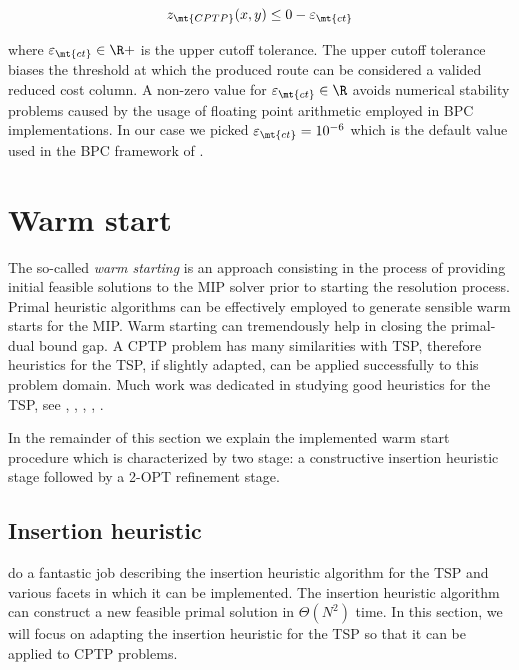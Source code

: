 \begin{equation}
	z_\mt{CPTP}(x, y) \le 0 - \varepsilon_{\mt{ct}}
\end{equation}

where $\varepsilon_{\mt{ct}} \in \R+$ is the upper cutoff tolerance.
The upper cutoff tolerance biases the threshold at which the produced
route can be considered a valided reduced cost column.
A non-zero value for $\varepsilon_{\mt{ct}} \in \R$ avoids numerical
stability problems caused by the usage of floating point arithmetic
employed in BPC implementations.
In our case we picked $\varepsilon_{\mt{ct}} = 10^{-6}$ which
is the default value used in the BPC framework of \textcite{sadykov2021}.

\section{Warm start}
\label{sec:impl-warm-start}

The so-called \textit{warm starting} is an approach consisting in the process
of providing initial feasible solutions to the MIP solver prior to starting
the resolution process.
Primal heuristic algorithms can be effectively employed to generate sensible warm starts for the MIP.
Warm starting can tremendously help in closing the primal-dual bound gap.
A CPTP problem has many similarities with TSP, therefore heuristics for the TSP, if slightly adapted,
can be applied successfully to this problem domain.
Much work was dedicated in studying good heuristics for the TSP, see \cite{rosenkrantz1977}, \cite{johnson1997}, \cite{laporte1992}, \cite{johnson2007}, \cite{hoffman2013}.

In the remainder of this section we explain the implemented warm start procedure which is characterized by two stage: a constructive insertion heuristic stage followed by a 2-OPT refinement stage.

\subsection{Insertion heuristic}
\label{sec:impl-insertion-heuristic}

\cite{rosenkrantz1977} do a fantastic job describing the insertion heuristic algorithm
for the TSP and various facets in which it can be implemented.
The insertion heuristic algorithm
can construct a new feasible primal solution in $\Theta(N^2)$ time.
In this section,
we will focus on adapting the insertion heuristic for the TSP so that it can be applied to CPTP problems.

